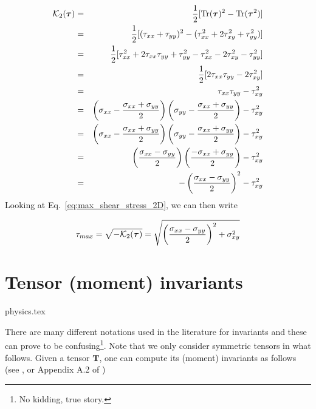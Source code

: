 \begin{eqnarray}
{\cal K}_2({\bm \tau}) 
&=& \frac{1}{2}[{\rm Tr}({\bm \tau}) ^2 - {\rm Tr}({\bm \tau}^2)] \nonumber\\
&=& \frac{1}{2}[ (\tau_{xx}+\tau_{yy})^2 - (\tau_{xx}^2+2\tau_{xy}^2+\tau_{yy}^2)] \nonumber\\
&=& \frac{1}{2}[ \tau_{xx}^2+2\tau_{xx}\tau_{yy} +\tau_{yy}^2 - \tau_{xx}^2-2\tau_{xy}^2-\tau_{yy}^2] \nonumber\\
&=& \frac{1}{2}[ 2\tau_{xx}\tau_{yy} -2\tau_{xy}^2] \nonumber\\
&=& \tau_{xx}\tau_{yy} -\tau_{xy}^2 \nonumber\\
&=& \left(\sigma_{xx}-\frac{\sigma_{xx}+\sigma_{yy}}{2}\right)
\left(\sigma_{yy}-\frac{\sigma_{xx}+\sigma_{yy}}{2}\right)
-\tau_{xy}^2 \nonumber\\
&=& \left(\sigma_{xx}-\frac{\sigma_{xx}+\sigma_{yy}}{2}\right)
\left(\sigma_{yy}-\frac{\sigma_{xx}+\sigma_{yy}}{2}\right)
-\tau_{xy}^2 \nonumber\\
&=& \left(\frac{\sigma_{xx}-\sigma_{yy}}{2}\right)
\left(\frac{-\sigma_{xx}+\sigma_{yy}}{2}\right)
-\tau_{xy}^2 \nonumber\\
&=& -\left(\frac{\sigma_{xx}-\sigma_{yy}}{2}\right)^2
-\tau_{xy}^2 \nonumber
\end{eqnarray}
Looking at Eq.~\eqref{eq:max_shear_stress_2D}, we can then write
\begin{mdframed}[backgroundcolor=blue!5]
\[
\tau_{max}= \sqrt{-{\cal K}_2(\bm\tau)}
=\sqrt{ \left(\frac{\sigma_{xx}-\sigma_{yy}}{2}\right)^2 +\sigma_{xy}^2 }
\]
\end{mdframed}


\newpage
\section{Tensor (moment) invariants}\label{sec:invariants}
\begin{flushright} {\tiny {\color{gray} physics.tex}} \end{flushright}


There are many different notations used in the literature for invariants 
and these can prove to be 
confusing\footnote{No kidding, true story.}. Note that we only consider symmetric tensors in what follows.
Given a tensor $\bm{T}$,  one can compute its (moment) invariants as follows 
(see \cite[p.339]{reddybook2}, or Appendix A.2 of \cite{zita2})

